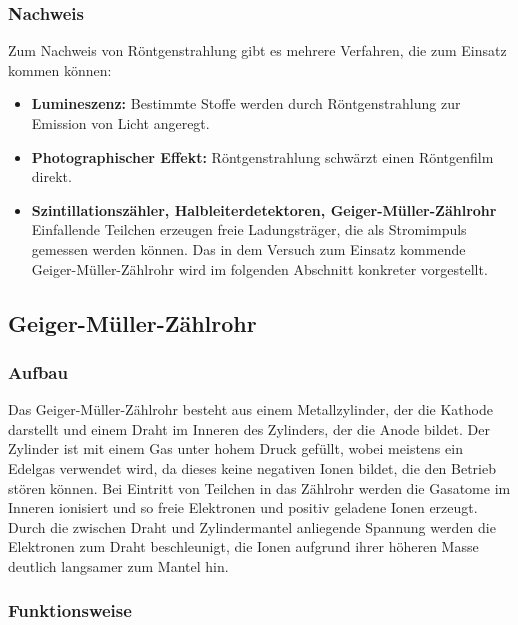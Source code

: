 \documentclass[11pt, a4paper]{article}
\numberwithin{equation}{section}
\begin{document}
\subsubsection{Nachweis}
Zum Nachweis von Röntgenstrahlung gibt es mehrere Verfahren, die zum Einsatz kommen können:
\begin{itemize}
	\item \textbf{Lumineszenz:} Bestimmte Stoffe werden durch Röntgenstrahlung zur Emission von Licht angeregt.
	
	\item \textbf{Photographischer Effekt:} Röntgenstrahlung schwärzt einen Röntgenfilm direkt.
	
	\item \textbf{Szintillationszähler, Halbleiterdetektoren, Geiger-Müller-Zählrohr} Einfallende Teilchen erzeugen freie Ladungsträger, die als Stromimpuls gemessen werden können. Das in dem Versuch zum Einsatz kommende Geiger-Müller-Zählrohr wird im folgenden Abschnitt konkreter vorgestellt.
\end{itemize}

\subsection{Geiger-Müller-Zählrohr}

\subsubsection{Aufbau}

Das Geiger-Müller-Zählrohr besteht aus einem Metallzylinder, der die Kathode darstellt und einem Draht im Inneren des Zylinders, der die Anode bildet.
Der Zylinder ist mit einem Gas unter hohem Druck gefüllt, wobei meistens ein Edelgas verwendet wird, da dieses keine negativen Ionen bildet, die den Betrieb stören können.
Bei Eintritt von Teilchen in das Zählrohr werden die Gasatome im Inneren ionisiert und so freie Elektronen und positiv geladene Ionen erzeugt.
Durch die zwischen Draht und Zylindermantel anliegende Spannung werden die Elektronen zum Draht beschleunigt, die Ionen aufgrund ihrer höheren Masse deutlich langsamer zum Mantel hin.

\subsubsection{Funktionsweise}
\end{document}
